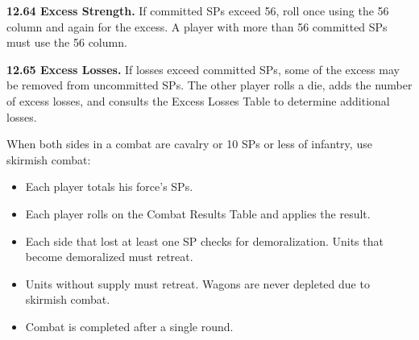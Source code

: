 \textbf{12.64 Excess Strength.} If committed SPs exceed 56, roll once using the 56 column and again for the excess. A player with more than 56 committed SPs must use the 56 column.

\textbf{12.65 Excess Losses.} If losses exceed committed SPs, some of the excess may be removed from uncommitted SPs. The other player rolls a die, adds the number of excess losses, and consults the Excess Losses Table to determine additional losses.


When both sides in a combat are cavalry or 10 SPs or less of infantry, use skirmish combat:
\begin{itemize}
\item Each player totals his force's SPs.
\item Each player rolls on the Combat Results Table and applies the result.
\item Each side that lost at least one SP checks for demoralization. Units that become demoralized must retreat.
\item Units without supply must retreat. Wagons are never depleted due to skirmish combat.
\item Combat is completed after a single round.
\end{itemize}

